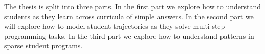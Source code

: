 The thesis is split into three parts. In the first part we explore how to understand students as they learn across curricula of simple answers. In the second part we will explore how to model student trajectories as they solve multi step programming tasks. In the third part we explore how to understand patterns in sparse student programs.














